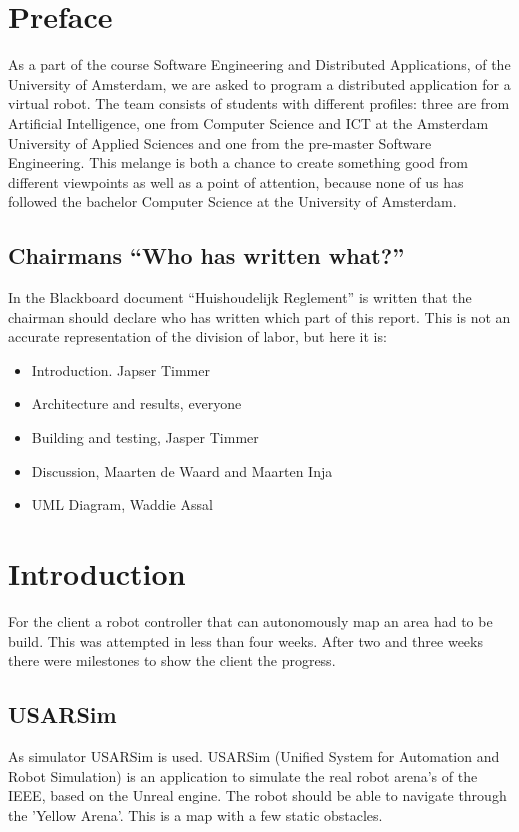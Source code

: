 \documentclass[titlepage, a4paper,10pt]{article}
\begin{document}


\tableofcontents 
\newpage

\section{Preface}
As a part of the course Software Engineering and Distributed Applications, of
the University of Amsterdam, we are asked to program a distributed application
for a virtual robot. The team consists of students with different profiles:
three are from Artificial Intelligence, one from Computer Science and ICT at the
Amsterdam University of Applied Sciences and one from the pre-master Software
Engineering. This melange is both a chance to create something good from
different viewpoints as well as a point of attention, because none of us has
followed the bachelor Computer Science at the University of Amsterdam. 

\subsection{Chairmans ``Who has written what?''}
In the Blackboard document ``Huishoudelijk Reglement'' is written that the chairman should declare who has written which
part of this report. This is not an accurate representation of the division of labor, but here it is:
\begin{itemize}
    \item Introduction. Japser Timmer
    \item Architecture and results, everyone
    \item Building and testing, Jasper Timmer
    \item Discussion, Maarten de Waard and Maarten Inja
    \item UML Diagram, Waddie Assal
\end{itemize}


\newpage

\section{Introduction}
For the client a robot controller that can autonomously map an area had to be build. This was attempted in less than four weeks. After two and three weeks there were milestones to show the client the progress.

\subsection{USARSim}
As simulator USARSim is used. USARSim (Unified System for Automation and Robot Simulation) is an application to simulate the real robot arena's of the IEEE, based on the Unreal engine. The robot should be able to navigate through the 'Yellow Arena'. This is a map with a few static obstacles.
\end{document}
